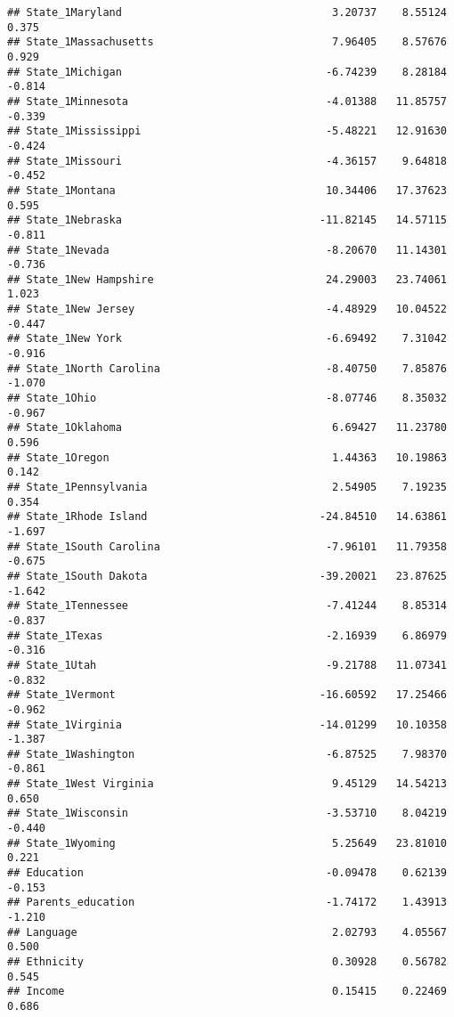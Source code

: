 \documentclass[
]{article}
\begin{document}
\begin{verbatim}
## State_1Maryland                                 3.20737    8.55124   0.375
## State_1Massachusetts                            7.96405    8.57676   0.929
## State_1Michigan                                -6.74239    8.28184  -0.814
## State_1Minnesota                               -4.01388   11.85757  -0.339
## State_1Mississippi                             -5.48221   12.91630  -0.424
## State_1Missouri                                -4.36157    9.64818  -0.452
## State_1Montana                                 10.34406   17.37623   0.595
## State_1Nebraska                               -11.82145   14.57115  -0.811
## State_1Nevada                                  -8.20670   11.14301  -0.736
## State_1New Hampshire                           24.29003   23.74061   1.023
## State_1New Jersey                              -4.48929   10.04522  -0.447
## State_1New York                                -6.69492    7.31042  -0.916
## State_1North Carolina                          -8.40750    7.85876  -1.070
## State_1Ohio                                    -8.07746    8.35032  -0.967
## State_1Oklahoma                                 6.69427   11.23780   0.596
## State_1Oregon                                   1.44363   10.19863   0.142
## State_1Pennsylvania                             2.54905    7.19235   0.354
## State_1Rhode Island                           -24.84510   14.63861  -1.697
## State_1South Carolina                          -7.96101   11.79358  -0.675
## State_1South Dakota                           -39.20021   23.87625  -1.642
## State_1Tennessee                               -7.41244    8.85314  -0.837
## State_1Texas                                   -2.16939    6.86979  -0.316
## State_1Utah                                    -9.21788   11.07341  -0.832
## State_1Vermont                                -16.60592   17.25466  -0.962
## State_1Virginia                               -14.01299   10.10358  -1.387
## State_1Washington                              -6.87525    7.98370  -0.861
## State_1West Virginia                            9.45129   14.54213   0.650
## State_1Wisconsin                               -3.53710    8.04219  -0.440
## State_1Wyoming                                  5.25649   23.81010   0.221
## Education                                      -0.09478    0.62139  -0.153
## Parents_education                              -1.74172    1.43913  -1.210
## Language                                        2.02793    4.05567   0.500
## Ethnicity                                       0.30928    0.56782   0.545
## Income                                          0.15415    0.22469   0.686

\end{verbatim}
\end{document}
